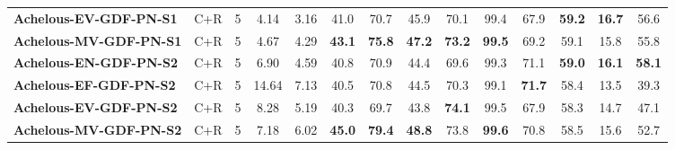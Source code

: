 \documentclass[letterpaper, 10 pt, conference]{ieeeconf}
\begin{document}
\begin{table*}
\begin{tabular}{l|cc|cc|ccc|cc|c|c|cc}
\textbf{Achelous-EV-GDF-PN-S1} & C+R & 5 & 4.14 & 3.16 & 41.0 & 70.7 & 45.9 & 70.1 & 99.4 & 67.9 & \textbf{59.2} & \textbf{16.7} & 56.6  \\
\textbf{Achelous-MV-GDF-PN-S1} & C+R & 5 & 4.67 & 4.29 & \textbf{43.1} & \textbf{75.8} & \textbf{47.2} & \textbf{73.2} & \textbf{99.5} & 69.2 & 59.1 & 15.8 & 55.8 \\
\midrule
\textbf{Achelous-EN-GDF-PN-S2} & C+R & 5 & 6.90 & 4.59 & 40.8 & 70.9 & 44.4 & 69.6 & 99.3 & 71.1 & \textbf{59.0} & \textbf{16.1} & \textbf{58.1} \\
\textbf{Achelous-EF-GDF-PN-S2} & C+R & 5 & 14.64 & 7.13 & 40.5 & 70.8 & 44.5 & 70.3 & 99.1 & \textbf{71.7} & 58.4 & 13.5 & 39.3  \\
\textbf{Achelous-EV-GDF-PN-S2} & C+R & 5 & 8.28 & 5.19 & 40.3 & 69.7 & 43.8 & \textbf{74.1} & 99.5 & 67.9 & 58.3 & 14.7 & 47.1 \\
\textbf{Achelous-MV-GDF-PN-S2} & C+R & 5 & 7.18 & 6.02 & \textbf{45.0} & \textbf{79.4} & \textbf{48.8} & 73.8 & \textbf{99.6} & 70.8 & 58.5 & 15.6 & 52.7 \\

\midrule


\end{tabular}
\end{table*}
\end{document}
